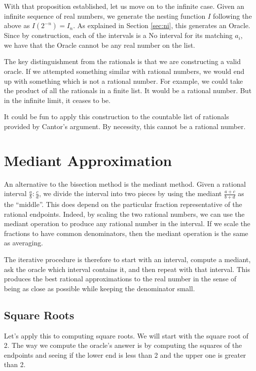 \documentclass[12pt]{article}
\theoremstyle{remark}
\begin{document}
With that proposition established, let us move on to the infinite case. Given an infinite sequence of real numbers, we generate the nesting function $I$ following the above as $I(2^{-n}) = I_n$. As explained in Section \ref{sec:ni}, this generates an Oracle. Since by construction, each of the intervals is a No interval for its matching $a_i$, we have that the Oracle cannot be any real number on the list. 

The key distinguishment from the rationals is that we are constructing a valid oracle. If we attempted something similar with rational numbers, we would end up with something which is not a rational number. For example, we could take the product of all the rationals in a finite list. It would be a rational number. But in the infinite limit, it ceases to be. 

It could be fun to apply this construction to the countable list of rationals provided by Cantor's argument. By necessity, this cannot be a rational number. 




\section{Mediant Approximation}

An alternative to the bisection method is the mediant method. Given a rational interval $\frac{a}{b} : \frac{c}{d}$, we divide the interval into two pieces by using the mediant $\frac{a+c}{b+d}$ as the ``middle''. This does depend on the particular fraction representative of the rational endpoints. Indeed, by scaling the two rational numbers, we can use the mediant operation to produce any rational number in the interval. If we scale the fractions to have common denominators, then the mediant operation is the same as averaging.  

The iterative procedure is therefore to start with an interval, compute a mediant, ask the oracle which interval contains it, and then repeat with that interval. This produces the best rational approximations to the real number in the sense of being as close as possible while keeping the denominator small. 

\subsection{Square Roots}

Let's apply this to computing square roots. We will start with the square root of 2. The way we compute the oracle's answer is by computing the squares of the endpoints and seeing if the lower end is less than 2 and the upper one is greater than 2.
\end{document}
